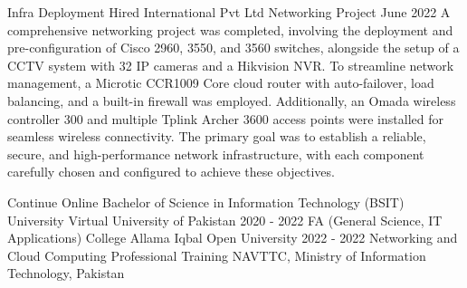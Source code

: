 \documentclass[9pt]{developercv} %
\begin{document}
\begin{entrylist}
    \entry
		{Infra Deployment}
		{Hired International Pvt Ltd Networking Project}
		{June 2022}
		{%
        A comprehensive networking project was completed, involving the deployment and pre-configuration of Cisco 2960, 3550, and 3560 switches, alongside the setup of a CCTV system with 32 IP cameras and a Hikvision NVR. To streamline network management, a Microtic CCR1009 Core cloud router with auto-failover, load balancing, and a built-in firewall was employed. Additionally, an Omada wireless controller 300 and multiple Tplink Archer 3600 access points were installed for seamless wireless connectivity. The primary goal was to establish a reliable, secure, and high-performance network infrastructure, with each component carefully chosen and configured to achieve these objectives.}
\end{entrylist}

\vspace{-10 pt}
\begin{entrylist}
    \entry
		{Continue Online}
		{Bachelor of Science in Information Technology (BSIT)}
		{University}
		{Virtual University of Pakistan}
    \entry
		{2020 - 2022}
		{FA (General Science, IT Applications)}
		{College}
		{Allama Iqbal Open University}
	\entry
		{2022 - 2022}
		{Networking and Cloud Computing}
		{Professional Training}
		{NAVTTC, Ministry of Information Technology, Pakistan}
\end{entrylist}
\end{document}
